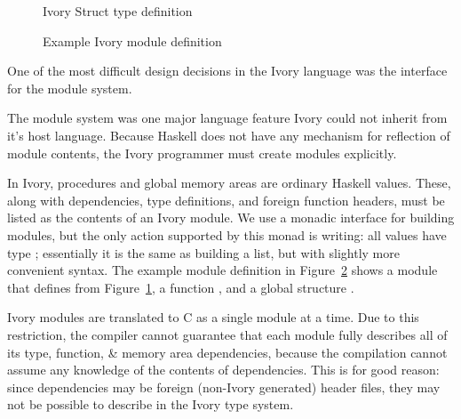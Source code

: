 \begin{figure}
    \begin{smcode}
    \end{smcode}
  \caption{Ivory Struct type definition}
  \label{fig:structqq}
\end{figure}

\begin{figure}
  \caption{Example Ivory module definition}
  \label{fig:module}
\end{figure}

One of the most difficult design decisions in the Ivory language was the
interface for the module system.

The module system was one major language feature Ivory could not inherit from
it's host language. Because Haskell does not have any mechanism for reflection
of module contents, the Ivory programmer must create modules explicitly.

In Ivory, procedures and global memory areas are ordinary Haskell values. These,
along with dependencies, type definitions, and foreign function headers, must be
listed as the contents of an Ivory module. We use a monadic interface for
building modules, but the only action supported by this  monad
is writing: all values have type ; essentially it is the same as
building a list, but with slightly more convenient syntax. The example module
definition in Figure~\ref{fig:module} shows a module that defines  from Figure~\ref{fig:structqq}, a function , and a global
structure .


Ivory modules are translated to C as a single module at a time. Due to this
restriction, the compiler cannot guarantee that each module fully describes all
of its type, function, \& memory area dependencies, because the compilation
cannot assume any knowledge of the contents of dependencies. This is for good
reason: since dependencies may be foreign (non-Ivory generated) header files,
they may not be possible to describe in the Ivory type system.

